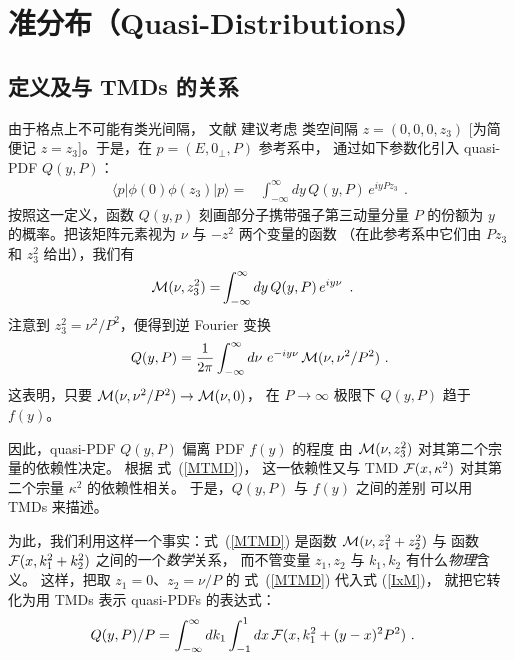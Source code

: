 \section{准分布（Quasi-Distributions）}

\subsection{定义及与 TMDs 的关系}

由于格点上不可能有类光间隔，
文献 \cite{Ji:2013dva} 建议考虑
类空间隔
$z= (0,0,0,z_3)$ [为简便记 \mbox{$z=z_3$}]。于是，在
\mbox{$p=(E, 0_\perp, P)$} 参考系中，
通过如下参数化引入 quasi-PDF $Q(y, P)$：
\begin{align}
\langle p |   \phi(0) \phi (z_3)|p \rangle
=  &
\int_{-\infty}^{\infty}   dy \,
Q(y, P) \,  e^{i y  P z_3 } \,
\  .
\label{newVDFxzQ}
\end{align}
按照这一定义，函数 $Q(y,p)$ 刻画部分子携带强子第三动量分量 $P$ 的份额为 $y$
的概率。把该矩阵元素视为 $\nu$ 与 $-z^2$ 两个变量的函数
（在此参考系中它们由 $Pz_3$ 和 $z_3^2$ 给出），我们有
\begin{align}
{\cal M} (\nu,z_3^2)
=  &
\int_{-\infty}^{\infty}   dy \,
Q(y, P) \,  e^{i y  \nu } \,
\  .
\end{align}
注意到 $z_3^2= \nu^2/P^2$，便得到逆 Fourier 变换
\begin{align}
Q(y,  P)   =\frac{1}{2 \pi}  \int_{-\infty}^{\infty}  d\nu \,
\, e^{-i y  \nu}  \, {\cal M} (\nu,  \nu^2/P^2)    \  .
\label{IxM}
\end{align}
这表明，只要 ${\cal M} (\nu,  \nu^2/P^2) \to {\cal M} (\nu, 0)$，
在 $P \to \infty$ 极限下 $Q(y,  P)$ 趋于 $f(y)$。

因此，quasi-PDF $Q(y,  P)$ 偏离 PDF $f(y)$ 的程度
由 ${\cal M} (\nu,  z_3^2)$ 对其第二个宗量的依赖性决定。
根据 \mbox{式 (\ref{MTMD})，} 这一依赖性又与 TMD
${\cal F} (x, \kappa^2)$ 对其第二个宗量 $\kappa^2$ 的依赖性相关。
于是，$Q(y,  P)$ 与 $f(y)$ 之间的差别
可以用 TMDs 来描述。

为此，我们利用这样一个事实：\mbox{式 (\ref{MTMD})}
是函数 \mbox{${\cal M} (\nu,  z_1^2+z_2^2) $} 与
函数 ${\cal F} (x, k_1^2+k_2^2)$ 之间的一个{\it 数学}关系，
而不管变量
$z_1,z_2$ 与 $k_1,k_2$ 有什么{\it 物理}含义。
这样，把取 $z_1=0$、$z_2 =\nu/P$ 的 \mbox{式 (\ref{MTMD})}
代入式 (\ref{IxM})，
就把它转化为用 TMDs 表示 quasi-PDFs 的表达式：
\begin{align}
Q(y, P) /P =  & \,\int_{-\infty}^{\infty} d  k_1
\int_{-1} ^ {1} d  x \,   {\cal F} (x, k_1^2+(y-x)^2P^2 )
\  .
\label{QTMD}
\end{align}

